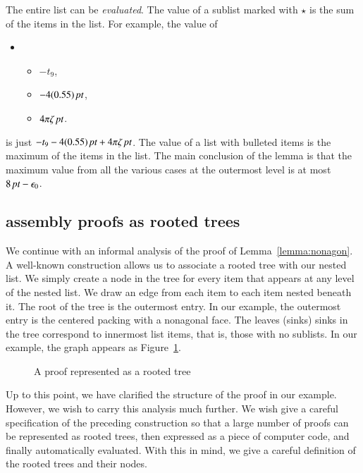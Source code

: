 The entire list can be {\it evaluated}.  The value of
a sublist marked with $\star$ is the sum of the items in the list.
For example, the value of 
\begin{itemize}\item[]
\begin{itemize}
\item $-t_9$,
\item $-4(0.55)\,\hbox{\it pt}$,
\item $4\pi\zeta\,\hbox{\it pt}$.
\end{itemize}
\end{itemize}
is just $-t_9 - 4(0.55)\,\hbox{\it pt} + 4\pi\zeta\,\hbox{\it pt}$.
The value of a list with bulleted items
is the maximum of the items in the list.
The main conclusion of the lemma is that the maximum value from all
the various cases at the outermost level is at most $8\,\hbox{\it pt} -\epsilon_0$.


\subsection{assembly proofs as rooted trees}

We continue with an informal analysis of the proof of Lemma~\ref{lemma:nonagon}.
A well-known construction allows us to associate a rooted
tree with our nested list.  We simply create a node in the tree
for every item that appears at any level of the nested list.  We
draw an edge from each item to each item nested beneath it.
The root of the tree is the outermost entry.  In our example, the
outermost entry is the centered packing with a nonagonal face.
The leaves (sinks) sinks in the tree correspond to innermost list
items, that is, those with no sublists.  In our example, the graph
appears as Figure~\ref{fig:rooted-tree}. 

\begin{figure}[htb]
  \centering
  \caption{A proof represented as a rooted tree}
  \label{fig:rooted-tree}
\end{figure}

Up to this point, we have clarified the structure of the proof in
our example.  However, we wish to carry this analysis much further.
We wish give a careful specification of the preceding construction
so that a large number of proofs 
can be represented as rooted trees, then
expressed as a piece of computer code, and finally automatically evaluated.
With this in mind, we give a careful definition of the rooted
trees and their nodes.

